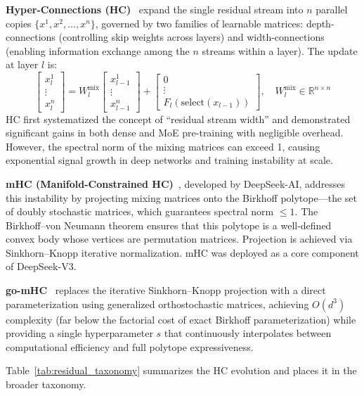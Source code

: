 \textbf{Hyper-Connections (HC)}~\cite{zhu2024hyper} expand the single residual stream into $n$ parallel copies $\{x^1, x^2, \ldots, x^n\}$, governed by two families of learnable matrices: depth-connections (controlling skip weights across layers) and width-connections (enabling information exchange among the $n$ streams within a layer). The update at layer $l$ is:
\begin{equation}
\begin{bmatrix} x_l^1 \\ \vdots \\ x_l^n \end{bmatrix} = W_l^{\text{mix}} \begin{bmatrix} x_{l-1}^1 \\ \vdots \\ x_{l-1}^n \end{bmatrix} + \begin{bmatrix} 0 \\ \vdots \\ F_l(\text{select}(x_{l-1})) \end{bmatrix}, \quad W_l^{\text{mix}} \in \mathbb{R}^{n \times n}
\label{eq:hc}
\end{equation}
HC first systematized the concept of ``residual stream width'' and demonstrated significant gains in both dense and MoE pre-training with negligible overhead. However, the spectral norm of the mixing matrices can exceed 1, causing exponential signal growth in deep networks and training instability at scale.

\textbf{mHC (Manifold-Constrained HC)}~\cite{xie2025mhc}, developed by DeepSeek-AI, addresses this instability by projecting mixing matrices onto the Birkhoff polytope---the set of doubly stochastic matrices, which guarantees spectral norm $\leq 1$. The Birkhoff--von Neumann theorem ensures that this polytope is a well-defined convex body whose vertices are permutation matrices. Projection is achieved via Sinkhorn--Knopp iterative normalization. mHC was deployed as a core component of DeepSeek-V3.

\textbf{go-mHC}~\cite{gomhc2026} replaces the iterative Sinkhorn--Knopp projection with a direct parameterization using generalized orthostochastic matrices, achieving $O(d^3)$ complexity (far below the factorial cost of exact Birkhoff parameterization) while providing a single hyperparameter $s$ that continuously interpolates between computational efficiency and full polytope expressiveness.

Table~\ref{tab:residual_taxonomy} summarizes the HC evolution and places it in the broader taxonomy.

